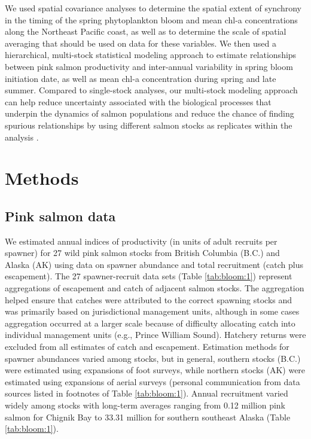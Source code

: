 We used spatial covariance analyses to determine the spatial extent of synchrony
in the timing of the spring phytoplankton bloom and mean chl-a concentrations
along the Northeast Pacific coast, as well as to determine the scale of spatial
averaging that should be used on data for these variables. We then used a
hierarchical, multi-stock statistical modeling approach to estimate
relationships between pink salmon productivity and inter-annual variability in
spring bloom initiation date, as well as mean chl-a concentration during spring
and late summer.  Compared to single-stock analyses, our multi-stock modeling
approach can help reduce uncertainty associated with the biological processes
that underpin the dynamics of salmon populations and reduce the chance of
finding spurious relationships by using different salmon stocks as replicates
within the analysis \citep{Myers1998c, Myers1999a}.


\section{Methods}

\subsection{Pink salmon data}

We estimated annual indices of productivity (in units of adult recruits per
spawner) for 27 wild pink salmon stocks from British Columbia (B.C.) and Alaska
(AK) using data on spawner abundance and total recruitment (catch plus
escapement). The 27 spawner-recruit data sets (Table \ref{tab:bloom:1}) represent aggregations
of escapement and catch of adjacent salmon stocks. The aggregation helped ensure
that catches were attributed to the correct spawning stocks and was primarily
based on jurisdictional management units, although in some cases aggregation
occurred at a larger scale because of difficulty allocating catch into
individual management units (e.g., Prince William Sound). Hatchery returns were
excluded from all estimates of catch and escapement. Estimation methods for
spawner abundances varied among stocks, but in general, southern stocks (B.C.)
were estimated using expansions of foot surveys, while northern stocks (AK) were
estimated using expansions of aerial surveys (personal communication from data
sources listed in footnotes of Table \ref{tab:bloom:1}). Annual recruitment varied widely among
stocks with long-term averages ranging from 0.12 million pink salmon for Chignik
Bay to 33.31 million for southern southeast Alaska (Table \ref{tab:bloom:1}).

